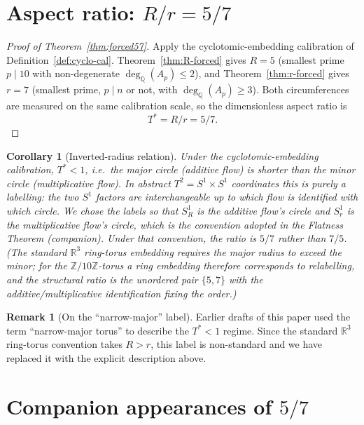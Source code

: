 \documentclass[11pt,reqno]{amsart}
\theoremstyle{plain}
\newtheorem{corollary}[theorem]{Corollary}
\theoremstyle{definition}
\newtheorem{remark}[theorem]{Remark}
\newcommand{\Z}{\mathbb{Z}}
\newcommand{\Q}{\mathbb{Q}}
\newcommand{\Zts}{\Z/10\Z}
\newcommand{\Tstar}{T^{*}}
\begin{document}
\section{Aspect ratio: $R/r = 5/7$}

\begin{proof}[Proof of Theorem~\ref{thm:forced57}]
Apply the cyclotomic-embedding calibration of Definition~\ref{def:cyclo-cal}. Theorem~\ref{thm:R-forced} gives $R = 5$ (smallest prime $p \mid 10$ with non-degenerate $\deg_{\Q}(A_{p}) \le 2$), and Theorem~\ref{thm:r-forced} gives $r = 7$ (smallest prime, $p \mid n$ or not, with $\deg_{\Q}(A_{p}) \ge 3$). Both circumferences are measured on the same calibration scale, so the dimensionless aspect ratio is
\[
\Tstar = R/r = 5/7.
\]
\end{proof}

\begin{corollary}[Inverted-radius relation] \label{cor:R-less-r}
Under the cyclotomic-embedding calibration, $\Tstar < 1$, i.e.\ the major circle (additive flow) is shorter than the minor circle (multiplicative flow). In abstract $T^{2} = S^{1} \times S^{1}$ coordinates this is purely a labelling: the two $S^{1}$ factors are interchangeable up to which flow is identified with which circle. We chose the labels so that $S^{1}_{R}$ is the additive flow's circle and $S^{1}_{r}$ is the multiplicative flow's circle, which is the convention adopted in the Flatness Theorem (companion). Under that convention, the ratio is $5/7$ rather than $7/5$. (The standard $\mathbb{R}^{3}$ ring-torus embedding requires the major radius to exceed the minor; for the $\Zts$-torus a ring embedding therefore corresponds to relabelling, and the structural ratio is the unordered pair $\{5, 7\}$ with the additive/multiplicative identification fixing the order.)
\end{corollary}

\begin{remark}[On the ``narrow-major'' label]
Earlier drafts of this paper used the term ``narrow-major torus'' to describe the $\Tstar < 1$ regime. Since the standard $\mathbb{R}^{3}$ ring-torus convention takes $R > r$, this label is non-standard and we have replaced it with the explicit description above.
\end{remark}

\section{Companion appearances of $5/7$} \label{sec:companions}
\end{document}
